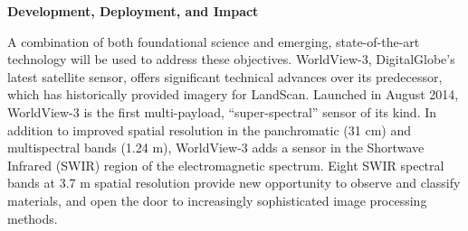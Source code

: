 \documentclass[11pt,letterpaper,sans]{moderncv}
\begin{document}
\textbf{Development, Deployment, and Impact}
\newline 

A combination of both foundational science and emerging, state-of-the-art technology will be used to address these objectives. WorldView-3, DigitalGlobe's latest satellite sensor, offers significant technical advances over its predecessor, which has historically provided imagery for LandScan. Launched in August 2014, WorldView-3 is the first multi-payload, ``super-spectral'' sensor of its kind. In addition to improved spatial resolution in the panchromatic (31 cm) and multispectral bands (1.24 m), WorldView-3 adds a sensor in the Shortwave Infrared (SWIR) region of the electromagnetic spectrum. Eight SWIR spectral bands at 3.7 m spatial resolution provide new opportunity to observe and classify materials, and open the door to increasingly sophisticated image processing methods. 
\newline 
\end{document}
